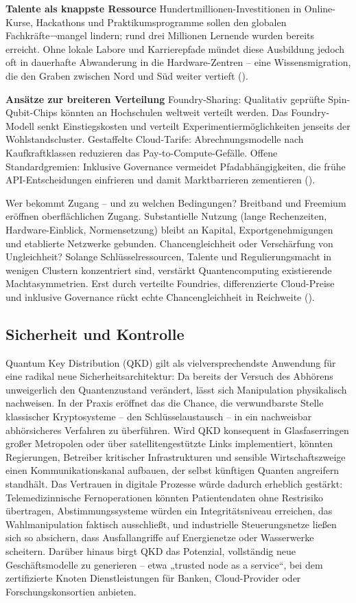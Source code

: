 \textbf{Talente als knappste Ressource}
Hundertmillionen-Investitionen in Online-Kurse, Hackathons und Praktikumsprogramme sollen den globalen Fachkräfte¬mangel lindern; rund drei Millionen Lernende wurden bereits erreicht. Ohne lokale Labore und Karrierepfade mündet diese Ausbildung jedoch oft in dauerhafte Abwanderung in die Hardware-Zentren – eine Wissensmigration, die den Graben zwischen Nord und Süd weiter vertieft (\cite{seskirDemocratizationQuantumTechnologies2022}).

\textbf{Ansätze zur breiteren Verteilung}
Foundry-Sharing: Qualitativ geprüfte Spin-Qubit-Chips könnten an Hochschulen weltweit verteilt werden. Das Foundry-Modell senkt Einstiegskosten und verteilt Experimentiermöglichkeiten jenseits der Wohlstandscluster.
Gestaffelte Cloud-Tarife: Abrechnungsmodelle nach Kaufkraftklassen reduzieren das Pay-to-Compute-Gefälle.
Offene Standardgremien: Inklusive Governance vermeidet Pfadabhängigkeiten, die frühe API-Entscheidungen einfrieren und damit Marktbarrieren zementieren (\cite{seskirDemocratizationQuantumTechnologies2022}).

Wer bekommt Zugang – und zu welchen Bedingungen? Breitband und Freemium eröffnen oberflächlichen Zugang. Substantielle Nutzung (lange Rechenzeiten, Hardware-Einblick, Normensetzung) bleibt an Kapital, Exportgenehmigungen und etablierte Netzwerke gebunden.
Chancengleichheit oder Verschärfung von Ungleichheit? Solange Schlüsselressourcen, Talente und Regulierungsmacht in wenigen Clustern konzentriert sind, verstärkt Quantencomputing existierende Machtasymmetrien. Erst durch verteilte Foundries, differenzierte Cloud-Preise und inklusive Governance rückt echte Chancengleichheit in Reichweite (\cite{seskirDemocratizationQuantumTechnologies2022}).

\subsection{Sicherheit und Kontrolle}
Quantum Key Distribution (QKD) gilt als vielversprechendste Anwendung für eine radikal neue Sicherheitsarchitektur: Da bereits der Versuch des Abhörens unweigerlich den Quantenzustand verändert, lässt sich Manipulation physikalisch nachweisen. In der Praxis eröffnet das die Chance, die verwundbarste Stelle klassischer Kryptosysteme – den Schlüsselaustausch – in ein nachweisbar abhörsicheres Verfahren zu überführen. Wird QKD konsequent in Glasfaserringen großer Metropolen oder über satellitengestützte Links implementiert, könnten Regierungen, Betreiber kritischer Infrastrukturen und sensible Wirtschaftszweige einen Kommunikationskanal aufbauen, der selbst künftigen Quanten angreifern standhält. Das Vertrauen in digitale Prozesse würde dadurch erheblich gestärkt: Telemedizinnische Fernoperationen könnten Patientendaten ohne Restrisiko übertragen, Abstimmungssysteme würden ein Integritätsniveau erreichen, das Wahlmanipulation faktisch ausschließt, und industrielle Steuerungsnetze ließen sich so absichern, dass Ausfallangriffe auf Energienetze oder Wasserwerke scheitern. Darüber hinaus birgt QKD das Potenzial, vollständig neue Geschäftsmodelle zu generieren – etwa „trusted node as a service“, bei dem zertifizierte Knoten Dienstleistungen für Banken, Cloud-Provider oder Forschungskonsortien anbieten.

